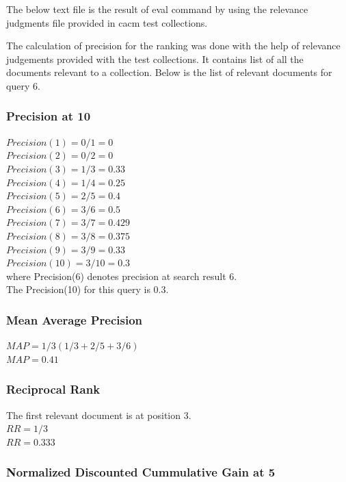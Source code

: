 \documentclass[12pt]{report}
\begin{document}
The below text file is the result of eval command by using the relevance judgments file provided in cacm test collections.


The calculation of precision for the ranking was done with the help of relevance judgements provided with the test collections. It contains list of all the documents relevant to a collection. Below is the list of relevant documents for query 6.



\subsubsection{ Precision at 10}

$Precision(1) = 0/1 = 0$\\
$Precision(2) = 0/2 = 0$\\ 
$Precision(3) = 1/3 = 0.33$\\
$Precision(4) = 1/4 = 0.25$\\
$Precision(5) = 2/5 = 0.4$\\
$Precision(6) = 3/6 = 0.5$\\
$Precision(7) = 3/7 = 0.429$\\
$Precision(8) = 3/8 = 0.375$\\
$Precision(9) = 3/9 = 0.33$\\
$Precision(10) = 3/10 = 0.3$\\
where Precision(6) denotes precision at search result 6.\\
The Precision(10) for this query is 0.3. \\  

\subsubsection{Mean Average Precision}

$MAP = 1/3 (1/3 + 2/5 + 3/6) $\\
$MAP = 0.41$
\subsubsection{Reciprocal Rank}
The first relevant document is at position 3.\\
$RR = 1/3 $\\
$RR = 0.333$\\

\subsubsection{Normalized Discounted Cummulative Gain at 5}
\end{document}
